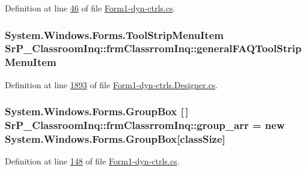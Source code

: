 \-Definition at line \hyperlink{_form1-dyn-ctrls_8cs_source_l00046}{46} of file \hyperlink{_form1-dyn-ctrls_8cs_source}{\-Form1-\/dyn-\/ctrls.\-cs}.

\hypertarget{class_sr_p___classroom_inq_1_1frm_classrrom_inq_a457cf8afff4e2fd2d76ffa56065350ad}{
\subsubsection[{general\-F\-A\-Q\-Tool\-Strip\-Menu\-Item}]{\setlength{\rightskip}{0pt plus 5cm}\-System.\-Windows.\-Forms.\-Tool\-Strip\-Menu\-Item {\bf \-Sr\-P\-\_\-\-Classroom\-Inq\-::frm\-Classrrom\-Inq\-::general\-F\-A\-Q\-Tool\-Strip\-Menu\-Item}}}
\label{class_sr_p___classroom_inq_1_1frm_classrrom_inq_a457cf8afff4e2fd2d76ffa56065350ad}


\-Definition at line \hyperlink{_form1-dyn-ctrls_8_designer_8cs_source_l01893}{1893} of file \hyperlink{_form1-dyn-ctrls_8_designer_8cs_source}{\-Form1-\/dyn-\/ctrls.\-Designer.\-cs}.

\hypertarget{class_sr_p___classroom_inq_1_1frm_classrrom_inq_a68d2b307c87e71592f6e170c9ce2aad2}{
\subsubsection[{group\-\_\-arr}]{\setlength{\rightskip}{0pt plus 5cm}\-System.\-Windows.\-Forms.\-Group\-Box \mbox{[}$\,$\mbox{]} {\bf \-Sr\-P\-\_\-\-Classroom\-Inq\-::frm\-Classrrom\-Inq\-::group\-\_\-arr} = new \-System.\-Windows.\-Forms.\-Group\-Box\mbox{[}{\bf class\-Size}\mbox{]}}}
\label{class_sr_p___classroom_inq_1_1frm_classrrom_inq_a68d2b307c87e71592f6e170c9ce2aad2}


\-Definition at line \hyperlink{_form1-dyn-ctrls_8cs_source_l00148}{148} of file \hyperlink{_form1-dyn-ctrls_8cs_source}{\-Form1-\/dyn-\/ctrls.\-cs}.


